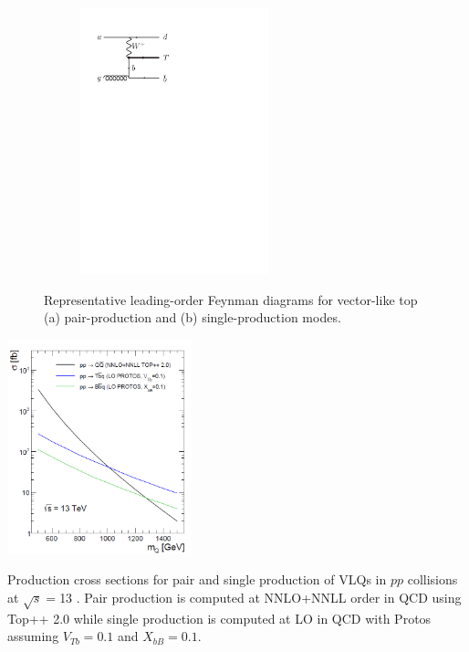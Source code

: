 \begin{figure}[h!]
\begin{subfigure}{0.5\textwidth}
  \includegraphics[width=0.6\textwidth]{figures/Theory/T_singleProd_good.pdf}
  \caption{}
  \label{}
\end{subfigure}

\captionsetup{width=0.85\textwidth} \caption{\small Representative leading-order Feynman diagrams for vector-like top (a) pair-production and (b) single-production modes.}
\label{fig:theo:VLQprod}
\end{figure}


\bfig[h!]
\centering
\includegraphics[width=0.4\textwidth]{figures/Theory/VLQxsec.png}
\captionsetup{width=0.85\textwidth} \caption{\small Production cross sections for pair and single production of VLQs in $pp$ collisions at $\sqrt{s}=$13 \tev. Pair production is computed at NNLO+NNLL order in QCD using {\sc Top++} 2.0 while single production is computed at LO in QCD with {\sc Protos} assuming $V_{Tb}=0.1$ and $X_{bB}=0.1$.}
\label{sec:theo:fig:vlqxsec}
\efig


